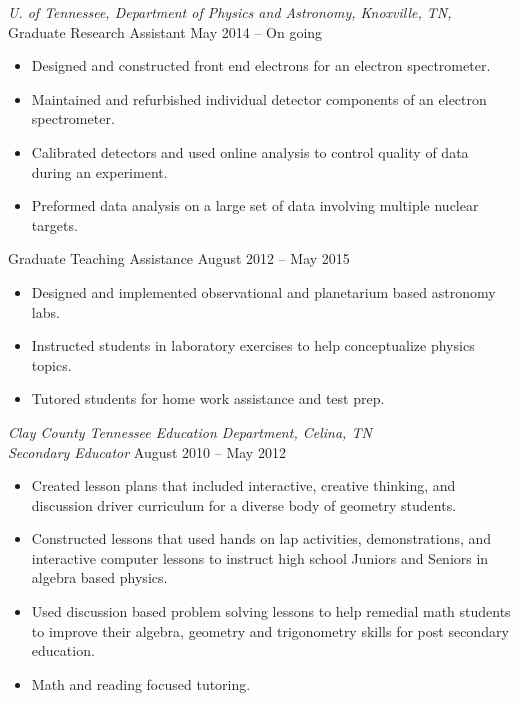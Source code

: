 \documentclass[10pt]{res} %
\begin{document}
\begin{resume}
\vspace{8pt} %


{\sl U. of Tennessee, Department of Physics and Astronomy,  Knoxville, TN,  } \\[2pt]
\vspace{-1pt} %
Graduate Research Assistant \hfill May 2014 -- On going 
\begin{itemize} \itemsep -2pt %
	\item Designed and constructed front end electrons for an electron spectrometer.
	\item Maintained and refurbished individual detector components of an electron spectrometer.
	\item Calibrated detectors and used online analysis to control quality of data during an experiment. 
	\item Preformed data analysis on a large set of data involving multiple nuclear targets. 
\end{itemize}
\vspace{-6pt} %
Graduate Teaching Assistance  \hfill August 2012 -- May 2015 
\begin{itemize} \itemsep -2pt %
	\item Designed and implemented observational and planetarium based astronomy labs. 
	\item Instructed students in laboratory exercises to help conceptualize physics topics.
	\item Tutored students for home work assistance and test prep.
\end{itemize} 

{\sl Clay County Tennessee Education Department, Celina, TN } \\[2pt]
{\sl Secondary Educator} \hfill August 2010 -- May 2012 \\
\vspace{-7pt} %
\begin{itemize} \itemsep -2pt %
\item Created lesson plans that included interactive, creative thinking, and discussion driver curriculum for a diverse body of geometry students.
\item Constructed lessons that used hands on lap activities, demonstrations, and interactive computer lessons to instruct high school Juniors and Seniors in algebra based physics. 
\item Used discussion based problem solving lessons to help remedial math students to improve their algebra, geometry and trigonometry skills for post secondary education. 
\item Math and reading focused tutoring. 
\end{itemize}


\end{resume}
\end{document}
